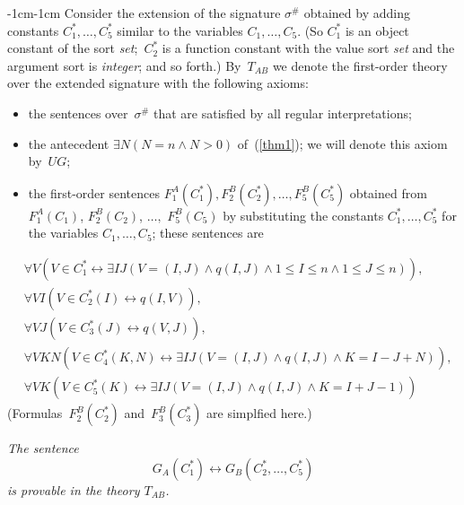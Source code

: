 \documentclass[11pt]{article}
\def\ug{\mathit{UG}}
\def\lrar{\leftrightarrow}
\def\beq{\begin{equation}}
\def\eeq#1{\label{#1}\end{equation}}
\begin{document}
\begin{adjustwidth}{-1cm}{-1cm}
Consider the extension of the signature $\sigma^\#$ obtained by adding
constants $C_1^*,\dots,C_5^*$ similar to the variables $C_1,\dots,C_5$.
(So $C_1^*$ is an object constant of the sort \emph{set\/};~$C_2^*$
is a function constant with the value sort \emph{set} and the argument
sort is \emph{integer\/}; and so forth.)  By~$T_{AB}$ we denote the
first-order theory over the extended signature with the following axioms:
\begin{itemize}
\item the sentences over~$\sigma^\#$ that are satisfied by all regular
  interpretations;
\item the antecedent $\exists N(N=n\land N>0)$ of~(\ref{thm1});
  we will denote this axiom by~$\ug$;
\item the first-order sentences $F^A_1(C^*_1),F^B_2(C^*_2),\dots,F^B_5(C^*_5)$ 
  obtained from $F^A_1(C_1)$, $F^B_2(C_2)$, $\dots,$ $F^B_5(C_5)$ by
  substituting the constants $C^*_1,\dots,C^*_5$ for the variables
  $C_1,\dots,C_5$; these sentences are
\end{itemize}
\begin{align}
& \forall V(V\in C^*_1 \lrar \exists IJ(V=(I,J)\land q(I,J) \land 1\leq I\leq n
\land 1\leq J\leq n)),\label{dd1}
  \\
& \forall V I(V\in C^*_2(I) \lrar q(I,V)),\label{dd2}
  \\
&  \forall V J(V\in C^*_3(J) \lrar q(V,J)),\label{dd3}
  \\
&\forall VKN(V\in C^*_4(K,N) \lrar \exists IJ(V=(I,J) \land q(I,J)
   \land K=I-J+N)),\label{dd4}
  \\
&\forall VK(V\in C^*_5(K) \lrar \exists IJ(V=(I,J) \land q(I,J)
   \land K=I+J-1))\label{dd5}
\end{align}
(Formulas~$F^B_2(C_2^*)$ and~$F^B_3(C_3^*)$ are simplfied here.)

\medskip{}
\emph{The sentence
  \beq
  G_A(C^*_1) \lrar G_B(C^*_2,\dots,C^*_5)
  \eeq{reform1}
is provable in the theory $T_{AB}$.}


\end{adjustwidth}
\end{document}
